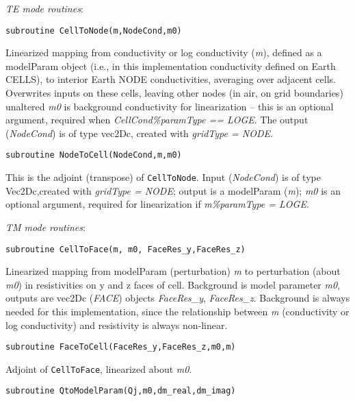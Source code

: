 \documentclass[12pt]{article}
\begin{document}
\vspace{10pt}

\noindent
{\it TE mode routines}:

\begin{verbatim}
subroutine CellToNode(m,NodeCond,m0)
\end{verbatim}

Linearized mapping from conductivity or log conductivity ({\it m}),
defined as a modelParam object (i.e., in this implementation
conductivity defined on Earth CELLS), to interior Earth NODE conductivities,
averaging over adjacent cells.  Overwrites inputs on
these cells, leaving  other nodes (in air, on grid boundaries) unaltered
{\it m0} is background conductivity for linearization -- 
this is an optional argument,
required when {\it CellCond\%paramType == LOGE}.
The output ({\it NodeCond}) is of type
vec2Dc, created with {\it gridType = NODE}.

\begin{verbatim}
subroutine NodeToCell(NodeCond,m,m0)
\end{verbatim}

This is the adjoint (transpose) of \verb|CellToNode|.  
Input ({\it NodeCond}) is of
type Vec2Dc,created with {\it gridType = NODE};
output is a modelParam ({\it m}); {\it m0} is an optional
argument, required for linearization if {\it m\%paramType = LOGE}.

\vspace{10pt}

\noindent
{\it TM mode routines}:

\begin{verbatim}
subroutine CellToFace(m, m0, FaceRes_y,FaceRes_z)
\end{verbatim}

Linearized mapping from modelParam (perturbation) {\it m} to 
perturbation (about {\it m0}) in resistivities on y and z faces of cell.
Background is model parameter {\it m0}, outputs are vec2Dc ({\it FACE})
objects {\it FaceRes\_y}, {\it FaceRes\_z}.  Background is always needed
for this implementation, since the relationship between {\it m} 
(conductivity or log  conductivity) and resistivity is always
non-linear.

\begin{verbatim}
subroutine FaceToCell(FaceRes_y,FaceRes_z,m0,m)
\end{verbatim}

Adjoint of \verb|CellToFace|, linearized about {\it m0}.  

\begin{verbatim}
subroutine QtoModelParam(Qj,m0,dm_real,dm_imag)
\end{verbatim}
\end{document}
